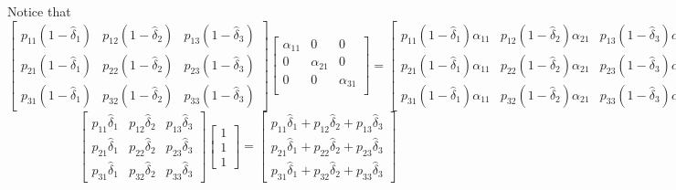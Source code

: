 \documentclass[journal,twoside,web]{ieeecolor}
\begin{document}
\begin{figure*}[ht]
\raggedright
Notice that 
\begin{equation*}
\begin{bmatrix}
    p_{11}(1-\hat{\delta}_{1}) & p_{12}(1-\hat{\delta}_{2}) & p_{13}(1-\hat{\delta}_{3}) \\
    p_{21}(1-\hat{\delta}_{1}) & p_{22}(1-\hat{\delta}_{2}) & p_{23}(1-\hat{\delta}_{3}) \\
    p_{31}(1-\hat{\delta}_{1}) & p_{32}(1-\hat{\delta}_{2}) & p_{33}(1-\hat{\delta}_{3}) 
\end{bmatrix}
\begin{bmatrix}
    \alpha_{11} & 0 & 0 \\
    0 & \alpha_{21} & 0 \\
    0 & 0 & \alpha_{31} \\
\end{bmatrix}=
\begin{bmatrix}
    p_{11}(1-\hat{\delta}_{1})\alpha_{11} & p_{12}(1-\hat{\delta}_{2})\alpha_{21} & p_{13}(1-\hat{\delta}_{3})\alpha_{31} \\
    p_{21}(1-\hat{\delta}_{1})\alpha_{11} & p_{22}(1-\hat{\delta}_{2})\alpha_{21} & p_{23}(1-\hat{\delta}_{3})\alpha_{31} \\
    p_{31}(1-\hat{\delta}_{1})\alpha_{11} & p_{32}(1-\hat{\delta}_{2})\alpha_{21} & p_{33}(1-\hat{\delta}_{3})\alpha_{31} 
\end{bmatrix}
\end{equation*}
\begin{equation*}
\begin{bmatrix}
    p_{11}\hat{\delta}_{1}  & p_{12}\hat{\delta}_{2}  & p_{13}\hat{\delta}_{3}  \\
    p_{21}\hat{\delta}_{1}  & p_{22}\hat{\delta}_{2}  & p_{23}\hat{\delta}_{3}  \\
    p_{31}\hat{\delta}_{1}  & p_{32}\hat{\delta}_{2}  & p_{33}\hat{\delta}_{3}  
\end{bmatrix}
\begin{bmatrix}
    1 \\ 1 \\ 1
\end{bmatrix} = 
\begin{bmatrix}
    p_{11}\hat{\delta}_{1}  + p_{12}\hat{\delta}_{2}  + p_{13}\hat{\delta}_{3} \\
    p_{21}\hat{\delta}_{1}  + p_{22}\hat{\delta}_{2}  + p_{23}\hat{\delta}_{3} \\
    p_{31}\hat{\delta}_{1}  + p_{32}\hat{\delta}_{2}  + p_{33}\hat{\delta}_{3} 

\end{bmatrix}
\end{equation*}
\end{figure*}
\end{document}
